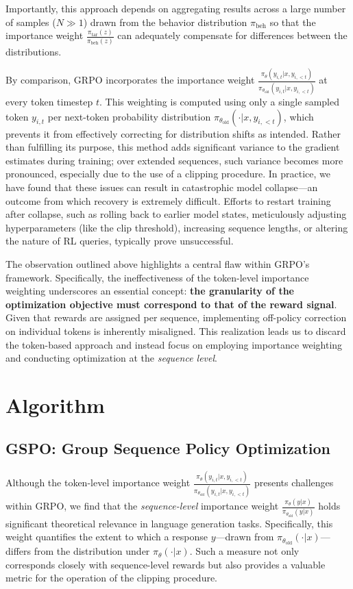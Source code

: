Importantly, this approach depends on aggregating results across a large number of samples ($N \gg 1$) drawn from the behavior distribution $\pi_\text{beh}$ so that the importance weight $\frac{ \pi_\text{tar} (z) }{ \pi_\text{beh} (z)}$ can adequately compensate for differences between the distributions.

By comparison, GRPO incorporates the importance weight $\frac{ \pi_{\theta} (y_{i,t} | x, y_{i,<t}) }{ \pi_{\theta_\text{old}} (y_{i,t} | x,y_{i,<t})}$ at every token timestep $t$. This weighting is computed using only a single sampled token $y_{i,t}$ per next-token probability distribution $\pi_{\theta_\text{old}}( \cdot | x, y_{i, <t})$, which prevents it from effectively correcting for distribution shifts as intended. Rather than fulfilling its purpose, this method adds significant variance to the gradient estimates during training; over extended sequences, such variance becomes more pronounced, especially due to the use of a clipping procedure. In practice, we have found that these issues can result in catastrophic model collapse—an outcome from which recovery is extremely difficult. Efforts to restart training after collapse, such as rolling back to earlier model states, meticulously adjusting hyperparameters (like the clip threshold), increasing sequence lengths, or altering the nature of RL queries, typically prove unsuccessful.

The observation outlined above highlights a central flaw within GRPO's framework. Specifically, the ineffectiveness of the token-level importance weighting underscores an essential concept: \textbf{the granularity of the optimization objective must correspond to that of the reward signal}. Given that rewards are assigned per sequence, implementing off-policy correction on individual tokens is inherently misaligned. This realization leads us to discard the token-based approach and instead focus on employing importance weighting and conducting optimization at the \textit{sequence level}.

\section{Algorithm}

\subsection{GSPO: Group Sequence Policy Optimization}

Although the token-level importance weight $\frac{ \pi_{\theta} (y_{i,t} | x, y_{i,<t}) }{ \pi_{\theta_\text{old}} (y_{i,t} | x,y_{i,<t})}$ presents challenges within GRPO, we find that the \textit{sequence-level} importance weight $\frac{ \pi_{\theta} (y | x) }{ \pi_{\theta_\text{old}} (y | x)}$ holds significant theoretical relevance in language generation tasks. Specifically, this weight quantifies the extent to which a response $y$—drawn from $\pi_{\theta_\text{old}} (\cdot | x)$—differs from the distribution under $\pi_{\theta} (\cdot | x)$. Such a measure not only corresponds closely with sequence-level rewards but also provides a valuable metric for the operation of the clipping procedure.

